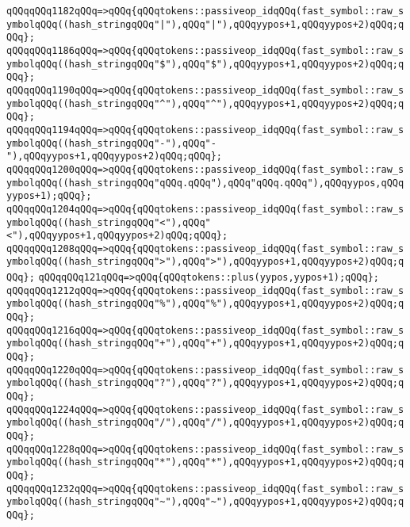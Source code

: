 \verb|qQQqqQQq1182qQQq=>qQQq{qQQqtokens::passiveop_idqQQq(fast_symbol::raw_symbolqQQq((hash_stringqQQq"|\verb#|"),qQQq"|"),qQQqyypos+1,qQQqyypos+2)qQQq;qQQq};#\newline
\verb|qQQqqQQq1186qQQq=>qQQq{qQQqtokens::passiveop_idqQQq(fast_symbol::raw_symbolqQQq((hash_stringqQQq"$"),qQQq"$"),qQQqyypos+1,qQQqyypos+2)qQQq;qQQq};|\newline
\verb|qQQqqQQq1190qQQq=>qQQq{qQQqtokens::passiveop_idqQQq(fast_symbol::raw_symbolqQQq((hash_stringqQQq"^"),qQQq"^"),qQQqyypos+1,qQQqyypos+2)qQQq;qQQq};|\newline
\verb|qQQqqQQq1194qQQq=>qQQq{qQQqtokens::passiveop_idqQQq(fast_symbol::raw_symbolqQQq((hash_stringqQQq"-"),qQQq"-"),qQQqyypos+1,qQQqyypos+2)qQQq;qQQq};|\newline
\verb|qQQqqQQq1200qQQq=>qQQq{qQQqtokens::passiveop_idqQQq(fast_symbol::raw_symbolqQQq((hash_stringqQQq"qQQq.qQQq"),qQQq"qQQq.qQQq"),qQQqyypos,qQQqyypos+1);qQQq};|\newline
\verb|qQQqqQQq1204qQQq=>qQQq{qQQqtokens::passiveop_idqQQq(fast_symbol::raw_symbolqQQq((hash_stringqQQq"<"),qQQq"<"),qQQqyypos+1,qQQqyypos+2)qQQq;qQQq};|\newline
\verb|qQQqqQQq1208qQQq=>qQQq{qQQqtokens::passiveop_idqQQq(fast_symbol::raw_symbolqQQq((hash_stringqQQq">"),qQQq">"),qQQqyypos+1,qQQqyypos+2)qQQq;qQQq};|\newline
\verb|qQQqqQQq121qQQq=>qQQq{qQQqtokens::plus(yypos,yypos+1);qQQq};|\newline
\verb|qQQqqQQq1212qQQq=>qQQq{qQQqtokens::passiveop_idqQQq(fast_symbol::raw_symbolqQQq((hash_stringqQQq"%"),qQQq"%"),qQQqyypos+1,qQQqyypos+2)qQQq;qQQq};|\newline
\verb|qQQqqQQq1216qQQq=>qQQq{qQQqtokens::passiveop_idqQQq(fast_symbol::raw_symbolqQQq((hash_stringqQQq"+"),qQQq"+"),qQQqyypos+1,qQQqyypos+2)qQQq;qQQq};|\newline
\verb|qQQqqQQq1220qQQq=>qQQq{qQQqtokens::passiveop_idqQQq(fast_symbol::raw_symbolqQQq((hash_stringqQQq"?"),qQQq"?"),qQQqyypos+1,qQQqyypos+2)qQQq;qQQq};|\newline
\verb|qQQqqQQq1224qQQq=>qQQq{qQQqtokens::passiveop_idqQQq(fast_symbol::raw_symbolqQQq((hash_stringqQQq"/"),qQQq"/"),qQQqyypos+1,qQQqyypos+2)qQQq;qQQq};|\newline
\verb|qQQqqQQq1228qQQq=>qQQq{qQQqtokens::passiveop_idqQQq(fast_symbol::raw_symbolqQQq((hash_stringqQQq"*"),qQQq"*"),qQQqyypos+1,qQQqyypos+2)qQQq;qQQq};|\newline
\verb|qQQqqQQq1232qQQq=>qQQq{qQQqtokens::passiveop_idqQQq(fast_symbol::raw_symbolqQQq((hash_stringqQQq"~"),qQQq"~"),qQQqyypos+1,qQQqyypos+2)qQQq;qQQq};|\newline
